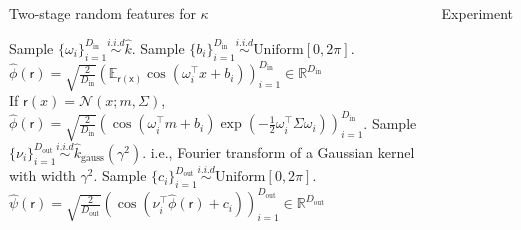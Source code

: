 \documentclass[english]{beamer}
\begin{document}
\begin{frame}
\begin{columns}[t]
\begin{block}{Two-stage random features for $\kappa$}
\begin{algorithmic}[1]
\STATE Sample  $\{ \omega_i \}_{i=1}^{D_\mathrm{in}} \overset{i.i.d}{\sim} \hat{k}$.
\STATE Sample $\{b_i\}_{i=1}^{D_\mathrm{in}} \overset{i.i.d}{\sim} \text{Uniform}[0, 2\pi] $.
\STATE $\hat{\phi}(\mathsf{r}) = \sqrt{\frac{2}{D_\mathrm{in}}} \left( \mathbb{E}_{\mathsf{r(x)}} 
\cos(\omega_{i}^{\top}x+b_{i} ) \right)_{i=1}^{D_\mathrm{in}} \in \mathbb{R}^{D_\mathrm{in}}$ \\
If $\mathsf{r}(x)=\mathcal{N}(x;m, \Sigma )$,  \\
$\hat{\phi}( \mathsf{r}) =  \sqrt{\frac{2}{D_\mathrm{in}}} \left( \cos(\omega_{i}^{\top}m +b_{i}) \exp 
\left(-\frac{1}{2}\omega_{i}^{\top}\Sigma \omega_{i} \right) \right)_{i=1}^{D_\mathrm{in}}$.
%
%
\STATE Sample $\{ \nu_i \}_{i=1}^{D_\mathrm{out}} \overset{i.i.d}{\sim} \hat{k}_{\text{gauss}}(\gamma^{2})$.  
i.e., Fourier transform of a Gaussian kernel with width $\gamma^2$.
\STATE Sample $\{c_i\}_{i=1}^{D_\mathrm{out}} \overset{i.i.d}{\sim} \text{Uniform}[0, 2\pi] $.
\STATE $\hat{\psi}(\mathsf{r}) = \sqrt{\frac{2}{D_\mathrm{out}}} \left(  
\cos(\nu_{i}^{\top} \hat{\phi}(\mathsf{r}) + c_{i} ) \right)_{i=1}^{D_\mathrm{out}} \in 
\mathbb{R}^{D_\mathrm{out}}$
\end{algorithmic}

\end{block}




\begin{block}{ Experiment}


\end{block}
\end{columns}
\end{frame}
\end{document}
